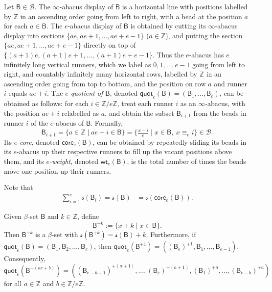 \documentclass[11pt,a4paper,reqno]{amsart}
\numberwithin{equation}{section}
\theoremstyle{plain}
\theoremstyle{definition}
\theoremstyle{remark}
\numberwithin{equation}{section}
\newcommand{\fs}{\mathcal{s}}
\newcommand{\wt}{\mathsf{wt}}
\newcommand{\core}{\mathsf{core}}
\newcommand{\quot}{\mathsf{quot}}
\newcommand{\ZZ}{\mathbb{Z}}
\newcommand{\BB}{\mathcal{B}}
\newcommand{\B}{\mathsf{B}}
\def\Z{{\mathbb Z}}
\begin{document}
Let $\B \in \BB$. The  $\infty$-abacus display of $\B$ is a horizontal line with positions labelled by $\Z$ in an ascending order going from left to right, with a bead at the position $a$ for each $a \in \B$.
The $e$-abacus display of $\B$ is obtained by cutting its $\infty$-abacus display into sections $\{ ae, ae+1, \dotsc, ae + e-1 \}$ ($a \in \Z$), and putting the section $\{ ae, ae+1, \dotsc, ae + e-1 \}$ directly on top of $\{ (a+1)e, (a+1)e+1, \dotsc, (a+1)e + e-1 \}$.
Thus the  $e$-abacus has $e$ infinitely long vertical runners, which we label as $0, 1,\dotsc, e-1$ going from left to right, and countably infinitely many horizontal rows, labelled by $\Z$ in an ascending order going from top to bottom, and the position on row $a$ and runner $i$ equals $ae + i$.
The {\em $e$-quotient of $\B$}, denoted $\quot_e(\B) = (\B_1,\dotsc, \B_{e})$, can be obtained as follows: for each $i \in \ZZ/e\ZZ$, treat each runner $i$ as an $\infty$-abacus, with the position $ae+i$ relabelled as $a$, and obtain the subset $\B_{i+1}$ from the beads in runner $i$ of the $e$-abacus of $\B$.  Formally,
$$
\B_{i+1} = \{ a \in \Z \mid ae+i \in \B \} = \{ \tfrac{x-i}{e} \mid x \in \B,\ x \equiv_e i \} \in \BB.
$$
Its {\em $e$-core}, denoted $\core_e(\B)$, can be obtained by repeatedly sliding its beads in its $e$-abacus up their respective runners to fill up the vacant positions above them, and its {\em $e$-weight}, denoted $\wt_e(\B)$, is the total number of times the beads move one position up their runners.

Note that
\begin{align*}
\sum_{i=1}^{e} \fs(\B_i) = \fs(\B) &= \fs(\core_e(\B)).
\end{align*}




Given $\beta$-set $\B$ and $k \in \Z$, define
$$
\B^{+k} :=  \{ x + k \mid x \in \B \}.
$$
Then $\B^{+k}$ is a $\beta$-set with $\fs(\B^{+k}) = \fs(\B) + k$.  
Furthermore, if $\quot_e(\B) = (\B_1,\B_2,\dotsc, \B_{e})$, then $\quot_e(\B^{+1}) = ((\B_{e})^{+1}, \B_1,\dotsc, \B_{e-1})$.
Consequently,
\begin{equation} \label{E:quot}
\quot_e(\B^{+(ae+b)}) = ((\B_{e-b+1})^{+(a+1)},\dotsc, (\B_{e})^{+(a+1)},(\B_1)^{+a}, \dotsc, (\B_{e-b})^{+a})
\end{equation}
for all $a \in \ZZ$ and $b \in \ZZ/e\ZZ$.
\end{document}
